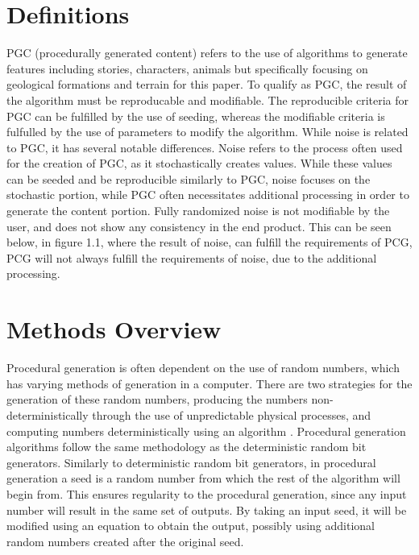 \documentclass[10pt]{report}
\begin{document}
		\section{Definitions}
		PGC (procedurally generated content) refers to the use of algorithms to generate features including stories, characters, animals but specifically focusing on geological formations and terrain for this paper. To qualify as PGC, the result of the algorithm must be reproducable and modifiable. The reproducible criteria for PGC can be fulfilled by the use of seeding, whereas the modifiable criteria is fulfulled by the use of parameters to modify the algorithm. While noise is related to PGC, it has several notable differences. Noise refers to the process often used for the creation of PGC, as it stochastically creates values. While these values can be seeded and be reproducible similarly to PGC, noise focuses on the stochastic portion, while PGC often necessitates additional processing in order to generate the content portion. Fully randomized noise is not modifiable by the user, and does not show any consistency in the end product. This can be seen below, in figure 1.1, where the result of noise, can fulfill the requirements of PCG, PCG will not always fulfill the requirements of noise, due to the additional processing. 
		

		
		\section{Methods Overview}
		
		Procedural generation is often dependent on the use of random numbers, which has varying methods of generation in a computer. There are two strategies for the generation of these random numbers, producing the numbers non-deterministically through the use of unpredictable physical processes, and computing numbers deterministically using an algorithm \cite{rng}. Procedural generation algorithms follow the same methodology as the deterministic random bit generators. Similarly to deterministic random bit generators, in procedural generation a seed is a random number from which the rest of the algorithm will begin from. This ensures regularity to the procedural generation, since any input number will result in the same set of outputs. By taking an input seed, it will be modified using an equation to obtain the output, possibly using additional random numbers created after the original seed.
		
\end{document}
